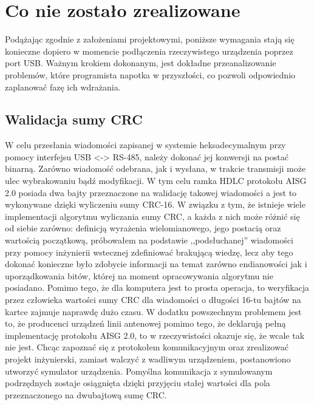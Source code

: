     \newpage
    \section{Co nie zostało zrealizowane}
    Podążając zgodnie z założeniami projektowymi, poniższe wymagania stają się konieczne dopiero w momencie podłączenia rzeczywistego urządzenia
    poprzez port USB. Ważnym krokiem dokonanym, jest dokładne przeanalizowanie problemów, które programista napotka w przyszłości,
    co pozwoli odpowiednio zaplanować fazę ich wdrażania.


    \subsection{Walidacja sumy CRC}
    W celu przesłania wiadomości zapisanej w systemie heksadecymalnym przy pomocy interfejsu USB <-> RS-485,
    należy dokonać jej konwersji na postać binarną. Zarówno wiadomość odebrana, jak i wysłana, w trakcie transmisji może ulec wybrakowaniu bądź
    modyfikacji. W tym celu ramka HDLC protokołu AISG 2.0 posiada dwa bajty przeznaczone na walidację takowej wiadomości a jest to wykonywane
    dzięki wyliczeniu sumy CRC-16. W związku z tym, że istnieje wiele implementacji algorytmu wyliczania sumy CRC, a każda z nich może różnić się od siebie zarówno:
    definicją wyrażenia wielomianowego, jego postacią oraz wartością początkową, próbowałem na podstawie ,,podsłuchanej'' wiadomości przy pomocy
    inżynierii wstecznej zdefiniować brakującą wiedzę, lecz aby tego dokonać konieczne było zdobycie informacji na temat zarówno endianowości
    jak i uporządkowania bitów, której na moment opracowywania algorytmu nie posiadano. Pomimo tego, że dla komputera jest to prosta operacja, to weryfikacja przez człowieka
    wartości sumy CRC dla wiadomości o długości 16-tu bajtów na kartce zajmuje naprawdę dużo czasu. W dodatku powszechnym problemem jest to, że 
    producenci urządzeń linii antenowej pomimo tego, że deklarują pełną implementację protokołu AISG 2.0, to w rzeczywistości okazuje się, że
    wcale tak nie jest. Chcąc zapoznać się z protokołem komunikacyjnym oraz zrealizować projekt inżynierski, zamiast walczyć z
    wadliwym urządzeniem, postanowiono utworzyć symulator urządzenia. Pomyślna komunikacja z symulowanym podrzędnych zostaje osiągnięta dzięki przyjęciu stałej wartości
    dla pola przeznaczonego na dwubajtową sumę CRC.
   
